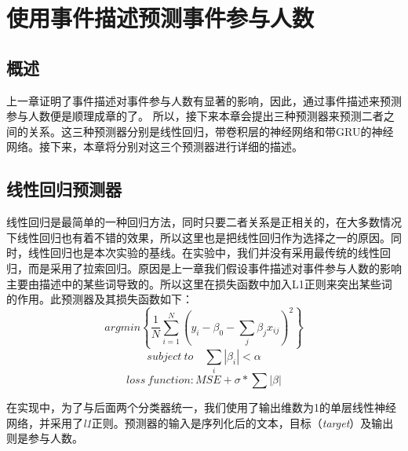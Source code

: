 \documentclass[12pt]{template}
\begin{document}
\section{使用事件描述预测事件参与人数}
\subsection{概述}
上一章证明了事件描述对事件参与人数有显著的影响，因此，通过事件描述来预测参与人数便是顺理成章的了。 所以，接下来本章会提出三种预测器来预测二者之间的关系。这三种预测器分别是线性回归，带卷积层的神经网络和带GRU的神经网络。接下来，本章将分别对这三个预测器进行详细的描述。

\subsection{线性回归预测器}
线性回归是最简单的一种回归方法，同时只要二者关系是正相关的，在大多数情况下线性回归也有着不错的效果，所以这里也是把线性回归作为选择之一的原因。同时，线性回归也是本次实验的基线。在实验中，我们并没有采用最传统的线性回归，而是采用了拉索回归。原因是上一章我们假设事件描述对事件参与人数的影响主要由描述中的某些词导致的。所以这里在损失函数中加入L1正则来突出某些词的作用。此预测器及其损失函数如下：
\[argmin\left\{\frac{1}{N}\displaystyle\sum_{i=1}^{N}(y_i-\beta_0-\displaystyle\sum_{j}\beta_jx_{ij})^2\right\}
    \]
\[subject\ to \quad \displaystyle\sum_{i}|\beta_i|<\alpha
    \]
\[loss\ function: MSE+\sigma*\sum|\beta|
\]

在实现中，为了与后面两个分类器统一，我们使用了输出维数为1的单层线性神经网络，并采用了\textit{l1}正则。预测器的输入是序列化后的文本，目标（\textit{target}）及输出则是参与人数。
\end{document}
